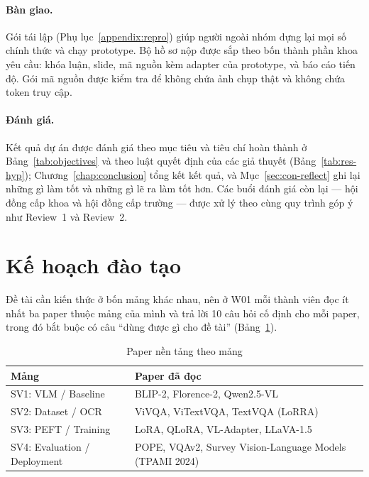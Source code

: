 \paragraph{Bàn giao.} Gói tái lập (Phụ lục~\ref{appendix:repro}) giúp người ngoài nhóm
dựng lại mọi số chính thức và chạy prototype. Bộ hồ sơ nộp được sắp theo bốn thành phần
khoa yêu cầu: khóa luận, slide, mã nguồn kèm adapter của prototype, và báo cáo tiến độ.
Gói mã nguồn được kiểm tra để không chứa ảnh chụp thật và không chứa token truy cập.

\paragraph{Đánh giá.} Kết quả dự án được đánh giá theo mục tiêu và tiêu chí hoàn thành ở
Bảng~\ref{tab:objectives} và theo luật quyết định của các giả thuyết
(Bảng~\ref{tab:res-hyp}); Chương~\ref{chap:conclusion} tổng kết kết quả, và
Mục~\ref{sec:con-reflect} ghi lại những gì làm tốt và những gì lẽ ra làm tốt hơn. Các
buổi đánh giá còn lại --- hội đồng cấp khoa và hội đồng cấp trường --- được xử lý theo
cùng quy trình góp ý như Review~1 và Review~2.

\section{Kế hoạch đào tạo}
\label{sec:pm-training}

Đề tài cần kiến thức ở bốn mảng khác nhau, nên ở W01 mỗi thành viên đọc ít nhất
ba paper thuộc mảng của mình và trả lời 10 câu hỏi cố định cho mỗi paper, trong
đó bắt buộc có câu ``dùng được gì cho đề tài'' (Bảng~\ref{tab:pm-papers}).

\begin{table}[htbp]
\caption{Paper nền tảng theo mảng}
\label{tab:pm-papers}
\centering
\small
\begin{tabular}{p{}p{}}
\toprule
\textbf{Mảng} & \textbf{Paper đã đọc} \\
\midrule
SV1: VLM / Baseline & BLIP-2, Florence-2, Qwen2.5-VL \\
SV2: Dataset / OCR & ViVQA, ViTextVQA, TextVQA (LoRRA) \\
SV3: PEFT / Training & LoRA, QLoRA, VL-Adapter, LLaVA-1.5 \\
SV4: Evaluation / Deployment & POPE, VQAv2, Survey Vision-Language Models (TPAMI 2024) \\
\bottomrule
\end{tabular}
\end{table}

